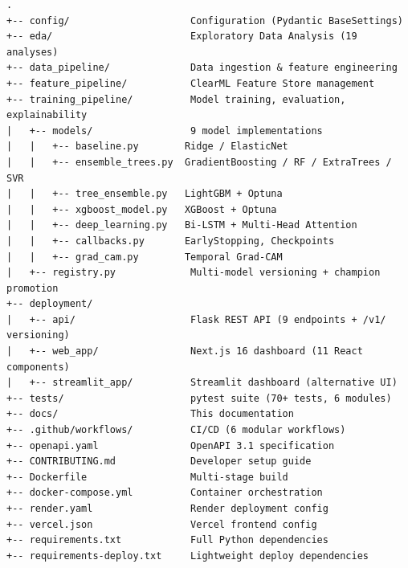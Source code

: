 \documentclass[12pt, a4paper, oneside]{article}
\begin{document}
\begin{lstlisting}[language={}, basicstyle=\ttfamily\footnotesize, caption={Complete project structure}]
.
+-- config/                     Configuration (Pydantic BaseSettings)
+-- eda/                        Exploratory Data Analysis (19 analyses)
+-- data_pipeline/              Data ingestion & feature engineering
+-- feature_pipeline/           ClearML Feature Store management
+-- training_pipeline/          Model training, evaluation, explainability
|   +-- models/                 9 model implementations
|   |   +-- baseline.py        Ridge / ElasticNet
|   |   +-- ensemble_trees.py  GradientBoosting / RF / ExtraTrees / SVR
|   |   +-- tree_ensemble.py   LightGBM + Optuna
|   |   +-- xgboost_model.py   XGBoost + Optuna
|   |   +-- deep_learning.py   Bi-LSTM + Multi-Head Attention
|   |   +-- callbacks.py       EarlyStopping, Checkpoints
|   |   +-- grad_cam.py        Temporal Grad-CAM
|   +-- registry.py             Multi-model versioning + champion promotion
+-- deployment/
|   +-- api/                    Flask REST API (9 endpoints + /v1/ versioning)
|   +-- web_app/                Next.js 16 dashboard (11 React components)
|   +-- streamlit_app/          Streamlit dashboard (alternative UI)
+-- tests/                      pytest suite (70+ tests, 6 modules)
+-- docs/                       This documentation
+-- .github/workflows/          CI/CD (6 modular workflows)
+-- openapi.yaml                OpenAPI 3.1 specification
+-- CONTRIBUTING.md             Developer setup guide
+-- Dockerfile                  Multi-stage build
+-- docker-compose.yml          Container orchestration
+-- render.yaml                 Render deployment config
+-- vercel.json                 Vercel frontend config
+-- requirements.txt            Full Python dependencies
+-- requirements-deploy.txt     Lightweight deploy dependencies
\end{lstlisting}
\end{document}
